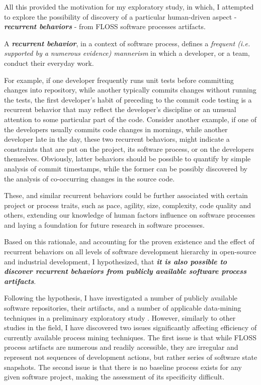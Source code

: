 All this provided the motivation for my exploratory study, in which, I attempted to explore the possibility 
of discovery of a particular human-driven aspect - \textit{\textbf{recurrent behaviors}} - from FLOSS software 
processes artifacts.
\begin{defn}\label{def_process}
A \textbf{\textit{recurrent behavior}}, in a context of software process, defines a \textit{frequent 
(i.e. supported by a numerous evidence) mannerism} in which a developer, or a team, conduct their everyday work.
\end{defn}

For example, if one developer frequently runs unit tests before committing changes into repository, 
while another typically commits changes without running the tests, the first developer's habit of 
preceding to the commit code testing is a recurrent behavior that may reflect the developer's discipline
or an unusual attention to some particular part of the code. 
Consider another example, if one of the developers usually commits code changes in mornings, while another 
developer late in the day, these two recurrent behaviors, might indicate a constraints that are put on the 
project, its software process, or on the developers themselves.
Obviously, latter behaviors should be possible to quantify by simple analysis of commit timestamps, while 
the former can be possibly discovered by the analysis of co-occurring changes in the source code. 

These, and similar recurrent behaviors could be further associated with certain project or process 
traits, such as pace, agility, size, complexity, code quality and others, extending our knowledge of human 
factors influence on software processes and laying a foundation for future research in software processes.

Based on this rationale, and accounting for the proven existence and the effect of recurrent behaviors on 
all levels of software development hierarchy \cite{citeulike:8347315} in open-source \cite{citeulike:200721}
and industrial \cite{citeulike:5090131} development, I hypothesized, that \textbf{\textit{it is also possible 
to discover recurrent behaviors from publicly available software process artifacts}}. 

Following the hypothesis, I have investigated a number of publicly available software repositories,
their artifacts, and a number of applicable data-mining techniques in a preliminary exploratory study 
\cite{csdl2-10-09}. However, similarly to other studies in the field, I have discovered two issues 
significantly affecting efficiency of currently available process mining techniques. 
The first issue is that while FLOSS process artifacts are numerous and readily accessible, 
they are irregular and represent not sequences of development actions, but rather series of software 
state snapshots. 
The second issue is that there is no baseline process exists for any given software project, making the 
assessment of its specificity difficult.

